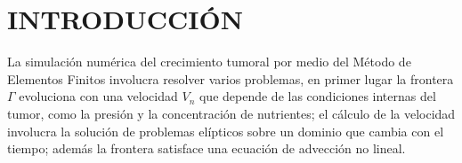 \chapter*{\MakeUppercase{Introducción}}
\thispagestyle{fancy}
La simulación numérica del crecimiento tumoral por medio del Método de Elementos Finitos involucra resolver varios problemas, en primer lugar la frontera $\Gamma$ evoluciona con una velocidad $V_n$ que depende de las condiciones internas del tumor, como la presión y la concentración de nutrientes; el cálculo de la velocidad involucra la solución de problemas elípticos sobre un dominio que cambia con el tiempo; además la frontera satisface una ecuación de advección no lineal. 

